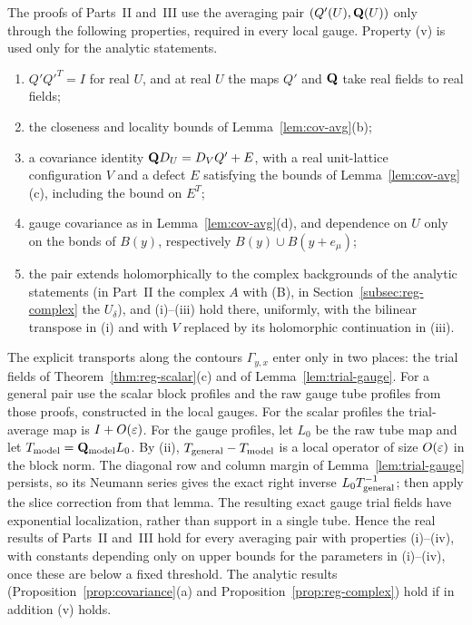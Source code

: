 \begin{remark}\label{rem:general-averaging}
The proofs of Parts~II and~III use the averaging pair $(Q'(U),\mathbf Q(U))$ only through the following properties, required in every local gauge. Property (v) is used only for the analytic statements.
\begin{enumerate}[label=(\roman*)]
\item $Q'Q'^T=I$ for real $U$, and at real $U$ the maps $Q'$ and $\mathbf Q$ take real fields to real fields;
\item the closeness and locality bounds of Lemma~\ref{lem:cov-avg}(b);
\item a covariance identity $\mathbf Q D_U=D_VQ'+E$, with a real unit-lattice configuration $V$ and a defect $E$ satisfying the bounds of Lemma~\ref{lem:cov-avg}(c), including the bound on $E^T$;
\item gauge covariance as in Lemma~\ref{lem:cov-avg}(d), and dependence on $U$ only on the bonds of $B(y)$, respectively $B(y)\cup B(y+e_\mu)$;
\item the pair extends holomorphically to the complex backgrounds of the analytic statements (in Part~II the complex $A$ with (B), in Section~\ref{subsec:reg-complex} the $U_\delta$), and (i)--(iii) hold there, uniformly, with the bilinear transpose in (i) and with $V$ replaced by its holomorphic continuation in (iii).
\end{enumerate}
The explicit transports along the contours $\Gamma_{y,x}$ enter only in two places: the trial fields of Theorem~\ref{thm:reg-scalar}(c) and of Lemma~\ref{lem:trial-gauge}. For a general pair use the scalar block profiles and the raw gauge tube profiles from those proofs, constructed in the local gauges. For the scalar profiles the trial-average map is $I+O(\varepsilon)$. For the gauge profiles, let $L_0$ be the raw tube map and let $T_{\rm model}=\mathbf Q_{\rm model}L_0$. By (ii), $T_{\rm general}-T_{\rm model}$ is a local operator of size $O(\varepsilon)$ in the block norm. The diagonal row and column margin of Lemma~\ref{lem:trial-gauge} persists, so its Neumann series gives the exact right inverse $L_0T_{\rm general}^{-1}$; then apply the slice correction from that lemma. The resulting exact gauge trial fields have exponential localization, rather than support in a single tube. Hence the real results of Parts~II and~III hold for every averaging pair with properties (i)--(iv), with constants depending only on upper bounds for the parameters in (i)--(iv), once these are below a fixed threshold. The analytic results (Proposition~\ref{prop:covariance}(a) and Proposition~\ref{prop:reg-complex}) hold if in addition (v) holds.


\end{remark}
